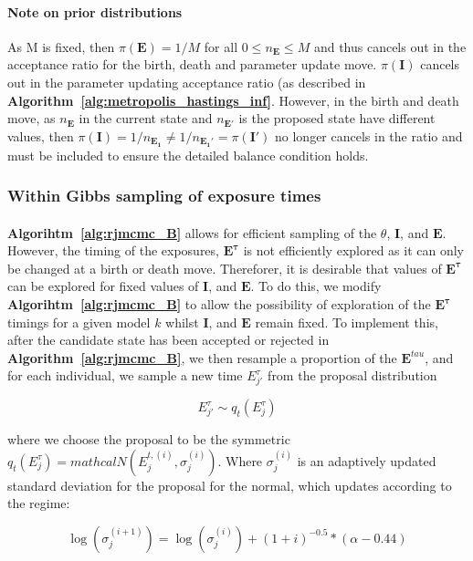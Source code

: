 \paragraph{Note on prior distributions}As M is fixed, then $\pi(\mathbf{E}) = 1/M$ for all $0 \leq n_{\mathbf{E}} \leq M$ and thus cancels out in the acceptance ratio for the birth, death and parameter update move. $\pi(\mathbf{I})$ cancels out in the parameter updating acceptance ratio (as described in \textbf{Algorithm~\ref{alg:metropolis_hastings_inf}}. However, in the birth and death move, as $n_{\mathbf{E}}$ in the current state and $n_{\mathbf{E}'}$ is the proposed state have different values, then $\pi(\mathbf{I}) = 1/n_\mathbf{E_1} \neq  1/n_\mathbf{E_1'} = \pi(\mathbf{I}')$ no longer cancels in the ratio and must be included to ensure the detailed balance condition holds. 

\subsubsection{Within Gibbs sampling of exposure times}

\paragraph{}\textbf{Algorihtm~\ref{alg:rjmcmc_B}} allows for efficient sampling of the $\theta$, $\mathbf{I}$, and $\mathbf{E}$. However, the timing of the exposures, $\mathbf{E^\tau}$ is not efficiently explored as it can only be changed at a birth or death move. Thereforer, it is desirable that values of $\mathbf{E^\tau}$ can be explored for fixed values of $\mathbf{I}$, and $\mathbf{E}$. To do this, we modify \textbf{Algorihtm~\ref{alg:rjmcmc_B}} to allow the possibility of exploration of the $\mathbf{E^\tau}$ timings for a given model $k$ whilst $\mathbf{I}$, and $\mathbf{E}$ remain fixed. To implement this, after the candidate state has been accepted or rejected in \textbf{Algorithm~\ref{alg:rjmcmc_B}}, we then resample a proportion of the $\mathbf{E}^{tau}$, and for each individual, we sample a new time $E_{j'}^\tau$ from the proposal distribution

$$E_{j'}^{\tau} \sim q_t(E_{j}^{\tau}) $$

where we choose the proposal to be the symmetric $q_t(E_{j}^{\tau}) = mathcal{N}(E_j^{t, (i)}, \sigma^{(i)}_j)$.  Where $\sigma^{(i)}_j$ is an adaptively updated standard deviation for the proposal for the normal, which updates according to the regime:

$$\log\left(\sigma^{(i + 1)}_j\right) = \log\left(\sigma^{(i)}_j\right) +  (1 + i)^{-0.5}*(\alpha - 0.44) $$

